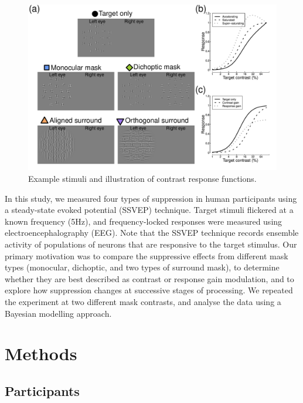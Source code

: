 \documentclass[]{article}
\begin{document}
\begin{figure}

{\centering \includegraphics{figures/stimfig} 

}

\caption{Example stimuli and illustration of contrast response functions.}\label{fig:stimfig}
\end{figure}

In this study, we measured four types of suppression in human participants using a steady-state evoked potential (SSVEP) technique. Target stimuli flickered at a known frequency (5Hz), and frequency-locked responses were measured using electroencephalography (EEG). Note that the SSVEP technique records ensemble activity of populations of neurons that are responsive to the target stimulus. Our primary motivation was to compare the suppressive effects from different mask types (monocular, dichoptic, and two types of surround mask), to determine whether they are best described as contrast or response gain modulation, and to explore how suppression changes at successive stages of processing. We repeated the experiment at two different mask contrasts, and analyse the data using a Bayesian modelling approach.

\hypertarget{methods}{%
\section{Methods}\label{methods}}

\hypertarget{participants}{%
\subsection{Participants}\label{participants}}
\end{document}
